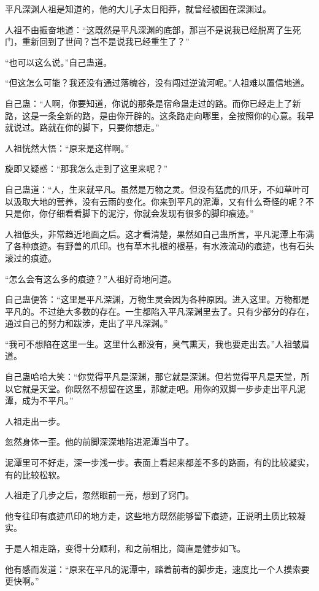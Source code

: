 \begin{this_body}
平凡深渊人祖是知道的，他的大儿子太日阳莽，就曾经被困在深渊过。

人祖不由振奋地道：“这既然是平凡深渊的底部，那岂不是说我已经脱离了生死门，重新回到了世间？岂不是说我已经重生了？”

“也可以这么说。”自己蛊道。

“但这怎么可能？我还没有通过落魄谷，没有闯过逆流河呢。”人祖难以置信地道。

自己蛊：“人啊，你要知道，你说的那条是宿命蛊走过的路。而你已经走上了新路，这是一条全新的路，是由你开辟的。这条路走向哪里，全按照你的心意。我早就说过。路就在你的脚下，只要你想走。”

人祖恍然大悟：“原来是这样啊。”

旋即又疑惑：“那我怎么走到了这里来呢？”

自己蛊道：“人，生来就平凡。虽然是万物之灵。但没有猛虎的爪牙，不如草叶可以汲取大地的营养，没有云雨的变化。你来到平凡的泥潭，又有什么奇怪的呢？不只是你，你仔细看看脚下的泥泞，你就会发现有很多的脚印痕迹。”

人祖低头，非常趋近地面之后。这才看清楚，果然如自己蛊所言，平凡泥潭上布满了各种痕迹。有野兽的爪印。也有草木扎根的根基，有水液流动的痕迹，也有石头滚过的痕迹。

“怎么会有这么多的痕迹？”人祖好奇地问道。

自己蛊便答：“这里是平凡深渊，万物生灵会因为各种原因。进入这里。万物都是平凡的。不过绝大多数的存在。一生都陷入平凡深渊里去了。只有少部分的存在，通过自己的努力和跋涉，走出了平凡深渊。”

“我可不想陷在这里一生。这里什么都没有，臭气熏天，我也要走出去。”人祖皱眉道。

自己蛊哈哈大笑：“你觉得平凡是深渊，那它就是深渊。但若觉得平凡是天堂，所以它就是天堂。你既然不想留在这里，那就走吧。用你的双脚一步步走出平凡泥潭，成为不平凡。”

人祖走出一步。

忽然身体一歪。他的前脚深深地陷进泥潭当中了。

泥潭里可不好走，深一步浅一步。表面上看起来都差不多的路面，有的比较凝实，有的比较松软。

人祖走了几步之后，忽然眼前一亮，想到了窍门。

他专往印有痕迹爪印的地方走，这些地方既然能够留下痕迹，正说明土质比较凝实。

于是人祖走路，变得十分顺利，和之前相比，简直是健步如飞。

他有感而发道：“原来在平凡的泥潭中，踏着前者的脚步走，速度比一个人摸索要更快啊。”


\end{this_body}
